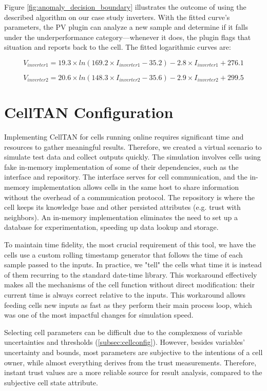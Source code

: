 Figure \ref{fig:anomaly_decision_boundary} illustrates the outcome of using the described algorithm on our case study inverters. With the fitted curve's parameters, the PV plugin can analyze a new sample and determine if it falls under the underperformance category—whenever it does, the plugin flags that situation and reports back to the cell.
The fitted logarithmic curves are:

$$
    V_{inverter1} = 19.3 \times ln(169.2 \times I_{inverter1} - 35.2) - 2.8 \times I_{inverter1} + 276.1
$$

$$
    V_{inverter2} = 20.6 \times ln(148.3 \times I_{inverter2} - 35.6) - 2.9 \times I_{inverter2} + 299.5 
$$

\section{CellTAN Configuration}

Implementing CellTAN for cells running online requires significant time and resources to gather meaningful results. Therefore, we created a virtual scenario to simulate test data and collect outputs quickly. The simulation involves cells using fake in-memory implementation of some of their dependencies, such as the interface and repository. The interface serves for cell communication, and the in-memory implementation allows cells in the same host to share information without the overhead of a communication protocol. The repository is where the cell keeps its knowledge base and other persisted attributes (e.g. trust with neighbors). An in-memory implementation eliminates the need to set up a database for experimentation, speeding up data lookup and storage.

To maintain time fidelity, the most crucial requirement of this tool, we have the cells use a custom rolling timestamp generator that follows the time of each sample passed to the inputs. In practice, we "tell" the cells what time it is instead of them recurring to the standard date-time library. This workaround effectively makes all the mechanisms of the cell function without direct modification: their current time is always correct relative to the inputs. This workaround allows feeding cells new inputs as fast as they perform their main process loop, which was one of the most impactful changes for simulation speed.

Selecting cell parameters can be difficult due to the complexness of variable uncertainties and thresholds (\ref{subsec:cellconfig}). However, besides variables' uncertainty and bounds, most parameters are subjective to the intentions of a cell owner, while almost everything derives from the trust measurements. Therefore, instant trust values are a more reliable source for result analysis, compared to the subjective cell state attribute.

